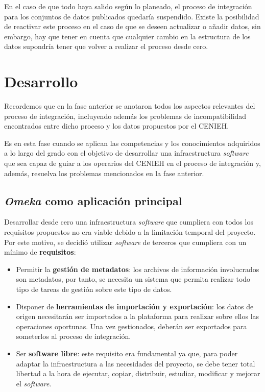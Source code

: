 En el caso de que todo haya salido según lo planeado, el proceso de
integración para los conjuntos de datos publicados quedaría suspendido.
Existe la posibilidad de reactivar este proceso en el caso de que se
deseen actualizar o añadir datos, sin embargo, hay que tener en cuenta
que cualquier cambio en la estructura de los datos supondría tener que
volver a realizar el proceso desde cero.

\section{Desarrollo}

Recordemos que en la fase anterior se anotaron todos los aspectos
relevantes del proceso de integración, incluyendo además los problemas
de incompatibilidad encontrados entre dicho proceso y los datos
propuestos por el CENIEH. 

Es en esta fase cuando se aplican las competencias y los conocimientos 
adquiridos a lo largo del grado con el objetivo de desarrollar una infraestructura 
\emph{software} que sea capaz de guiar a los operarios del CENIEH en el proceso de integración
y, además, resuelva los problemas mencionados en la fase anterior.

\subsection{\emph{Omeka} como aplicación principal}

Desarrollar desde cero una infraestructura \emph{software} que cumpliera
con todos los requisitos propuestos no era viable debido a la limitación
temporal del proyecto. Por este motivo, se decidió utilizar
\emph{software} de terceros que cumpliera con un mínimo de
\textbf{requisitos}:

\begin{itemize}
\tightlist
\item
  Permitir la \textbf{gestión de metadatos}: los archivos de información
  involucrados son metadatos, por tanto, se necesita un sistema que
  permita realizar todo tipo de tareas de gestión sobre este tipo de
  datos.
\item
  Disponer de \textbf{herramientas de importación y exportación}: los
  datos de origen necesitarán ser importados a la plataforma para
  realizar sobre ellos las operaciones oportunas. Una vez gestionados,
  deberán ser exportados para someterlos al proceso de integración.
\item
  Ser \textbf{software libre}: este requisito era fundamental ya que,
  para poder adaptar la infraestructura a las necesidades del proyecto,
  se debe tener total libertad a la hora de ejecutar, copiar,
  distribuir, estudiar, modificar y mejorar el \emph{software}.
\end{itemize}

